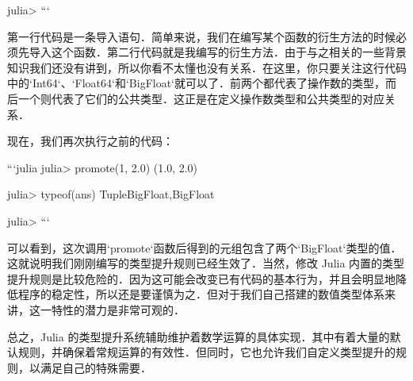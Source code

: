 julia>
```

第一行代码是一条导入语句．简单来说，我们在编写某个函数的衍生方法的时候必须先导入这个函数．第二行代码就是我编写的衍生方法．由于与之相关的一些背景知识我们还没有讲到，所以你看不太懂也没有关系．在这里，你只要关注这行代码中的`Int64`、`Float64`和`BigFloat`就可以了．前两个都代表了操作数的类型，而后一个则代表了它们的公共类型．这正是在定义操作数类型和公共类型的对应关系．

现在，我们再次执行之前的代码：

```julia
julia> promote(1, 2.0)
(1.0, 2.0)

julia> typeof(ans)
Tuple{BigFloat,BigFloat}

julia> 
```

可以看到，这次调用`promote`函数后得到的元组包含了两个`BigFloat`类型的值．这就说明我们刚刚编写的类型提升规则已经生效了．当然，修改 Julia 内置的类型提升规则是比较危险的．因为这可能会改变已有代码的基本行为，并且会明显地降低程序的稳定性，所以还是要谨慎为之．但对于我们自己搭建的数值类型体系来讲，这一特性的潜力是非常可观的．

总之，Julia 的类型提升系统辅助维护着数学运算的具体实现．其中有着大量的默认规则，并确保着常规运算的有效性．但同时，它也允许我们自定义类型提升的规则，以满足自己的特殊需要．